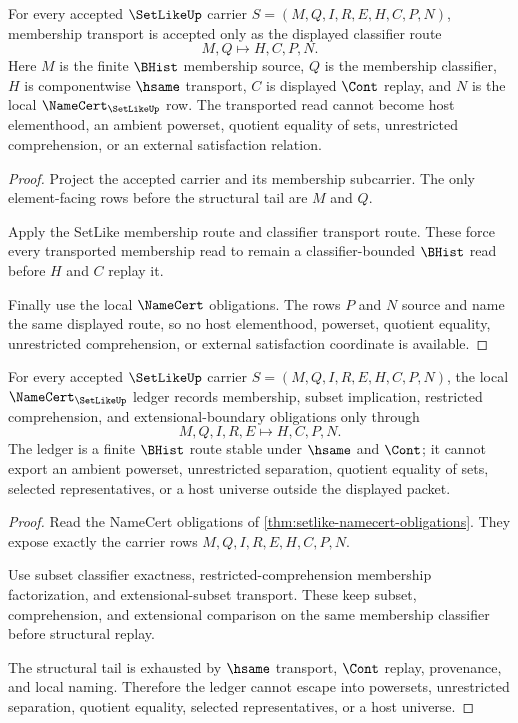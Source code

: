 \begin{theorem}
\label{thm:setlike-membership-classifier-transport}
For every accepted $\SetLikeUp$ carrier $S=(M,Q,I,R,E,H,C,P,N)$, membership transport is accepted only as the displayed classifier route
$$
M,Q \longmapsto H,C,P,N .
$$
Here $M$ is the finite $\BHist$ membership source, $Q$ is the membership classifier, $H$ is componentwise $\hsame$ transport, $C$ is displayed $\Cont$ replay, and $N$ is the local $\NameCert_{\SetLikeUp}$ row. The transported read cannot become host elementhood, an ambient powerset, quotient equality of sets, unrestricted comprehension, or an external satisfaction relation.
\end{theorem}
\begin{proof}
Project the accepted carrier and its membership subcarrier. The only element-facing rows before the structural tail are $M$ and $Q$.

Apply the SetLike membership route and classifier transport route. These force every transported membership read to remain a classifier-bounded $\BHist$ read before $H$ and $C$ replay it.

Finally use the local $\NameCert$ obligations. The rows $P$ and $N$ source and name the same displayed route, so no host elementhood, powerset, quotient equality, unrestricted comprehension, or external satisfaction coordinate is available.
\end{proof}

\begin{theorem}
\label{thm:setlike-namecert-ledger-nonescape}
For every accepted $\SetLikeUp$ carrier $S=(M,Q,I,R,E,H,C,P,N)$, the local $\NameCert_{\SetLikeUp}$ ledger records membership, subset implication, restricted comprehension, and extensional-boundary obligations only through
$$
M,Q,I,R,E \longmapsto H,C,P,N .
$$
The ledger is a finite $\BHist$ route stable under $\hsame$ and $\Cont$; it cannot export an ambient powerset, unrestricted separation, quotient equality of sets, selected representatives, or a host universe outside the displayed packet.
\end{theorem}
\begin{proof}
Read the NameCert obligations of \autoref{thm:setlike-namecert-obligations}. They expose exactly the carrier rows $M,Q,I,R,E,H,C,P,N$.

Use subset classifier exactness, restricted-comprehension membership factorization, and extensional-subset transport. These keep subset, comprehension, and extensional comparison on the same membership classifier before structural replay.

The structural tail is exhausted by $\hsame$ transport, $\Cont$ replay, provenance, and local naming. Therefore the ledger cannot escape into powersets, unrestricted separation, quotient equality, selected representatives, or a host universe.
\end{proof}

